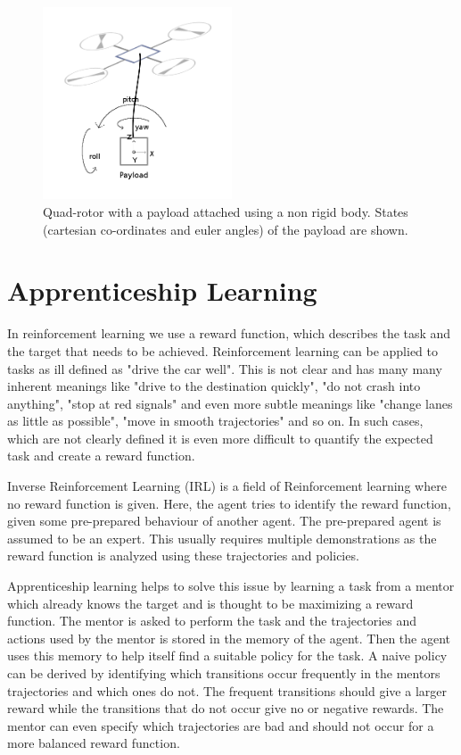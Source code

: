 \documentclass[hidelinks,BTech]{iitmdiss}
\begin{document}
\begin{figure}[H]
  \centering
    \includegraphics[width=0.5\textwidth]{payload.png}
    \caption{Quad-rotor with a payload attached using a non rigid body. States (cartesian co-ordinates and euler angles) of the payload are shown.}
\end{figure}

\section{Apprenticeship Learning}

In reinforcement learning we use a reward function, which describes the task and the target that needs to be achieved. Reinforcement learning can be applied to tasks as ill defined as "drive the car well". This is not clear and has many many inherent meanings like "drive to the destination quickly", "do not crash into anything", "stop at red signals" and even more subtle meanings like "change lanes as little as possible", "move in smooth trajectories" and so on. In such cases, which are not clearly defined it is even more difficult to quantify the expected task and create a reward function.

Inverse Reinforcement Learning (IRL) is a field of Reinforcement learning where no reward function is given. Here, the agent tries to identify the reward function, given some pre-prepared behaviour of another agent. The pre-prepared agent is assumed to be an expert. This usually requires multiple demonstrations as the reward function is analyzed using these trajectories and policies.

Apprenticeship learning \cite{ApprenticeshipLearning} helps to solve this issue by learning a task from a mentor which already knows the target and is thought to be maximizing a reward function. The mentor is asked to perform the task and the trajectories and actions used by the mentor is stored in the memory of the agent. Then the agent uses this memory to help itself find a suitable policy for the task. A naive policy can be derived by identifying which transitions occur frequently in the mentors trajectories and which ones do not. The frequent transitions should give a larger reward while the transitions that do not occur give no or negative rewards. The mentor can even specify which trajectories are bad and should not occur for a more balanced reward function.
\end{document}
